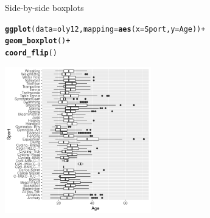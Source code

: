 \documentclass[10pt]{beamer}\usepackage[]{graphicx}\usepackage[]{color}
\makeatletter
\newcommand{\hlopt}[1]{\textcolor[rgb]{0,0,0}{#1}}%
\newcommand{\hlstd}[1]{\textcolor[rgb]{0.345,0.345,0.345}{#1}}%
\newcommand{\hlkwc}[1]{\textcolor[rgb]{0.333,0.667,0.333}{#1}}%
\newcommand{\hlkwd}[1]{\textcolor[rgb]{0.737,0.353,0.396}{\textbf{#1}}}%
\newenvironment{kframe}{%
 \def\at@end@of@kframe{}%
 \ifinner\ifhmode%
  \def\at@end@of@kframe{\end{minipage}}%
  \begin{minipage}{\columnwidth}%
 \fi\fi%
 \def\FrameCommand##1{\hskip\@totalleftmargin \hskip-\fboxsep
 \colorbox{shadecolor}{##1}\hskip-\fboxsep
     \hskip-\linewidth \hskip-\@totalleftmargin \hskip\columnwidth}%
 \MakeFramed {\advance\hsize-\width
   \@totalleftmargin\z@ \linewidth\hsize
   \@setminipage}}%
 {\par\unskip\endMakeFramed%
 \at@end@of@kframe}
\newenvironment{knitrout}{}{} %
\makeatother
\begin{document}
\begin{frame}[fragile]{Side-by-side boxplots}


\begin{knitrout}\scriptsize
{}\color{fgcolor}\begin{kframe}
\begin{alltt}
\hlkwd{ggplot}\hlstd{(}\hlkwc{data} \hlstd{= oly12,} \hlkwc{mapping} \hlstd{=} \hlkwd{aes}\hlstd{(}\hlkwc{x} \hlstd{= Sport,} \hlkwc{y} \hlstd{= Age))} \hlopt{+}
  \hlkwd{geom_boxplot}\hlstd{()} \hlopt{+}
  \hlkwd{coord_flip}\hlstd{()}
\end{alltt}
\end{kframe}
\includegraphics[width=2.5in,height=2.5in]{figure/unnamed-chunk-9-1} 

\end{knitrout}

\end{frame}
\end{document}

